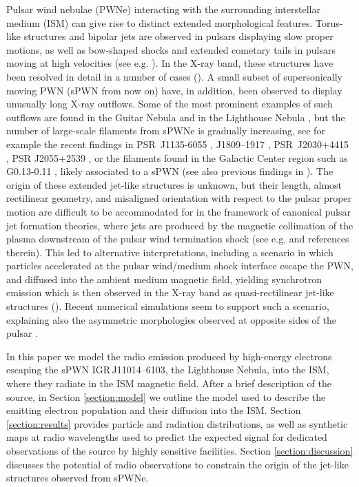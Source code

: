 \documentclass[letter]{aa}
\newcommand{\IGR}{IGR\,J11014--6103}
\begin{document}
Pulsar wind nebulae (PWNe) interacting with the surrounding interstellar medium (ISM) can give rise to distinct extended morphological features. Torus-like structures and bipolar jets are observed in  pulsars displaying slow proper motions, as well as bow-shaped shocks and extended cometary tails in pulsars moving at high velocities (see e.g. \citealp{Gaensler2006}). In the X-ray band, these structures have been resolved in detail in a number of cases (\citealp{Kargaltsev2008}). A small subset of supersonically moving PWN (sPWN from now on) have, in addition, been observed to display unusually long X-ray outflows. Some of the most prominent examples of such outflows are found in the Guitar Nebula \citep{Hui2012} and in the Lighthouse Nebula \citep{Pavan2014}, but the number of large-scale filaments from sPWNe is gradually increasing, see for example the recent findings in PSR~J1135-6055 \citep{Bordas2020}, J1809--1917 \citep{Klingler2020}, PSR~J2030+4415 \citep{Vries2020}, PSR J2055+2539 \citep{Marelli2019}, or the filaments found in the Galactic Center region such as G0.13-0.11 \citep{Zhang2020}, likely associated to a sPWN (see also previous findings in \citealp{Kargaltsev2017}). The origin of these extended jet-like structures is unknown, but their length, almost rectilinear geometry, and misaligned orientation with respect to the pulsar proper motion are difficult to be accommodated for in the framework of canonical pulsar jet formation theories, where jets are produced by the magnetic collimation of the plasma downstream of the pulsar wind termination shock (see e.g. \citealp{Lyubarsky2002, Komissarov2004, Porth2014} and references therein).
%
This led to alternative interpretations, including a scenario in which particles accelerated at the pulsar wind/medium shock interface escape the PWN, and diffused into the ambient medium magnetic field, yielding synchrotron emission which is then observed in the X-ray band as quasi-rectilinear jet-like structures (\citealp{Bandiera2008}). Recent numerical simulations seem to support such a scenario, explaining also the asymmetric morphologies observed at opposite sides of the pulsar \citep{Barkov2019a, Bucciantini2020}. 

In this paper we model the radio emission produced by high-energy electrons escaping the sPWN \IGR, the Lighthouse Nebula, into the ISM, where they radiate in the ISM magnetic field. After a brief description of the source, in Section \ref{section:model} we outline the model used to describe the emitting electron population and their diffusion into the ISM. Section \ref{section:results} provides particle and radiation distributions, as well as synthetic maps at radio wavelengths used to predict the expected signal for dedicated observations of the source by highly sensitive facilities. Section \ref{section:discussion} discusses the potential of radio observations to constrain the origin of the jet-like structures observed from sPWNe. 
\end{document}
